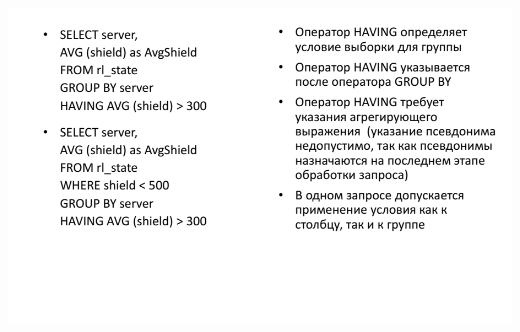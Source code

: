 \documentclass{beamer}
\begin{document}
\begin{frame}
\begin{center}
\includegraphics[scale=0.5]{images/having.png}
\end{center}
\end{frame} 
\end{document}
